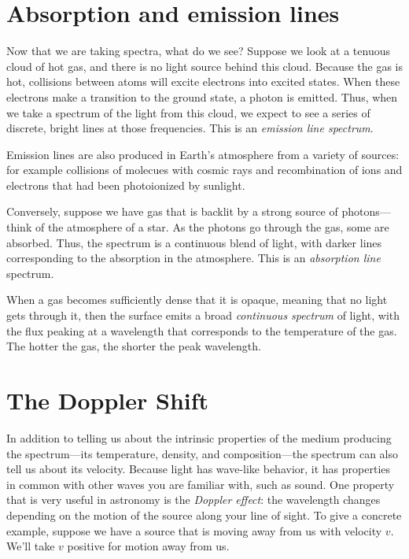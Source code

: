 \section{Absorption and emission lines}
Now that we are taking spectra, what do we see?  Suppose we look at a tenuous cloud of hot gas, and there is no light source behind this cloud. Because the gas is hot, collisions between atoms will excite electrons into excited states. When these electrons make a transition to the ground state, a photon is emitted. Thus, when we take a spectrum of the light from this cloud, we expect to see a series of discrete, bright lines at those frequencies. This is an \emph{emission line spectrum}. 

Emission lines are also produced in Earth's atmosphere from a variety of sources: for example collisions of molecues with cosmic rays and recombination of ions and electrons that had been photoionized by sunlight.

Conversely, suppose we have gas that is backlit by a strong source of photons---think of the atmosphere of a star. As the photons go through the gas, some are absorbed. Thus, the spectrum is a continuous blend of light, with darker lines corresponding to the absorption in the atmosphere.  This is an \emph{absorption line} spectrum.

When a gas becomes sufficiently dense that it is opaque, meaning that no light gets through it, then the surface emits a broad \emph{continuous spectrum} of light, with the flux peaking at a wavelength that corresponds to the temperature of the gas. The hotter the gas, the shorter the peak wavelength.


\section{The Doppler Shift}\label{s.doppler}

In addition to telling us about the intrinsic properties of the medium producing the spectrum---its temperature, density, and composition---the spectrum can also tell us about its velocity. Because light has wave-like behavior, it has properties in common with other waves you are familiar with, such as sound.  One property that is very useful in astronomy is the \emph{Doppler effect}: the wavelength changes depending on the motion of the source along your line of sight.  To give a concrete example, suppose we have a source that is moving away from us with velocity $v$.  We'll take $v$ positive for motion away from us.

